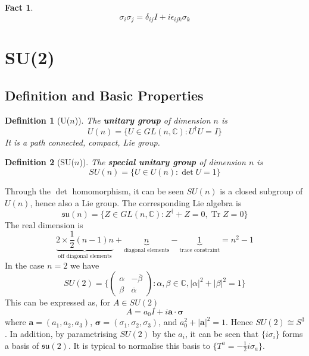 \documentclass{article}
\newtheorem{definition}{Definition}[subsection]
\newtheorem{fact}{Fact}[subsection]
\DeclareMathOperator{\tr}{Tr}
\newcommand{\bam}[1]{\textbf{#1}}
\newcommand{\mf}[1]{\mathfrak{#1}}
\newcommand{\mbb}[1]{\mathbb{#1}}
\newcommand{\be}{\begin{equation}}
\newcommand{\ee}{\end{equation}}
\begin{document}
\begin{fact}
\be
\sigma_i \sigma_j = \delta_{ij}I +i\epsilon_{ijk}\sigma_k
\ee
\end{fact}

\section{SU(2)}
\subsection{Definition and Basic Properties}

\begin{definition}[U($n$)]
The \bam{unitary group} of dimension $n$ is 
\[
U\left(n\right)=\lbrace U\in GL\left(n,\mbb{C}\right) : U^\dagger U=I \rbrace
\]
It is a path connected, compact, Lie group.
\end{definition}

\begin{definition}[SU($n$)]
The \bam{special unitary group} of dimension $n$ is
\[
SU\left(n\right)=\lbrace U\in U(n) : \det{U}=1 \rbrace
\]
\end{definition}
\noindent Through the $\det$ homomorphism, it can be seen $SU(n)$ is a closed subgroup of $U(n)$, hence also a Lie group.  The corresponding Lie algebra is 
\[
\mf{su}\left(n\right)=\lbrace Z\in GL\left(n,\mbb{C}\right) : Z^\dagger+Z=0, \tr{Z}=0 \rbrace
\]
The real dimension is
\[
\underbrace{2\times\frac{1}{2}(n-1)n}_{\text{off diagonal elements}}+\underbrace{n}_{\text{diagonal elements}}-\underbrace{1}_{\text{trace constraint}}=n^2-1
\]
In the case $n=2$ we have 
\[
SU(2)=\lbrace   \begin{pmatrix} \alpha & -\overline{\beta} \\ \beta & \overline{\alpha} \end{pmatrix}  : \alpha,\beta\in\mathbb{C} , |\alpha|^2+|\beta|^2=1  \rbrace
\]
This can be expressed as, for $A\in SU(2)$
\[
A=a_0 I +i\bm{a}\cdot\bm{\sigma}
\]
where $\bm{a}=(a_1, a_2, a_3)$, $\bm{\sigma}=(\sigma_1, \sigma_2, \sigma_3)$, and $a_0^2+|\bm{a}|^2=1$. Hence $SU(2)\cong S^3$. In addition, by parametrising $SU(2)$ by the $a_i$, it can be seen that $\lbrace i\sigma_i\rbrace$ forms a basis of $\mf{su}(2)$. It is typical to normalise this basis to $\lbrace T^a=-\frac{1}{2} i\sigma_a \rbrace$. 
\end{document}
